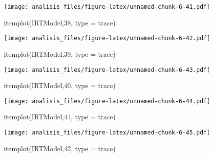 \documentclass[
]{article}
\newenvironment{Shaded}{\begin{snugshade}}{\end{snugshade}}
\newcommand{\AttributeTok}[1]{\textcolor[rgb]{0.77,0.63,0.00}{#1}}
\newcommand{\DecValTok}[1]{\textcolor[rgb]{0.00,0.00,0.81}{#1}}
\newcommand{\FunctionTok}[1]{\textcolor[rgb]{0.00,0.00,0.00}{#1}}
\newcommand{\NormalTok}[1]{#1}
\newcommand{\StringTok}[1]{\textcolor[rgb]{0.31,0.60,0.02}{#1}}
\begin{document}
\texttt{[image: analisis\_files/figure-latex/unnamed-chunk-6-41.pdf]}

\begin{Shaded}
\begin{Highlighting}[]
\FunctionTok{itemplot}\NormalTok{(IRTModel,}\DecValTok{38}\NormalTok{, }\AttributeTok{type =} \StringTok{\textquotesingle{}trace\textquotesingle{}}\NormalTok{)}
\end{Highlighting}
\end{Shaded}

\texttt{[image: analisis\_files/figure-latex/unnamed-chunk-6-42.pdf]}

\begin{Shaded}
\begin{Highlighting}[]
\FunctionTok{itemplot}\NormalTok{(IRTModel,}\DecValTok{39}\NormalTok{, }\AttributeTok{type =} \StringTok{\textquotesingle{}trace\textquotesingle{}}\NormalTok{)}
\end{Highlighting}
\end{Shaded}

\texttt{[image: analisis\_files/figure-latex/unnamed-chunk-6-43.pdf]}

\begin{Shaded}
\begin{Highlighting}[]
\FunctionTok{itemplot}\NormalTok{(IRTModel,}\DecValTok{40}\NormalTok{, }\AttributeTok{type =} \StringTok{\textquotesingle{}trace\textquotesingle{}}\NormalTok{)}
\end{Highlighting}
\end{Shaded}

\texttt{[image: analisis\_files/figure-latex/unnamed-chunk-6-44.pdf]}

\begin{Shaded}
\begin{Highlighting}[]
\FunctionTok{itemplot}\NormalTok{(IRTModel,}\DecValTok{41}\NormalTok{, }\AttributeTok{type =} \StringTok{\textquotesingle{}trace\textquotesingle{}}\NormalTok{)}
\end{Highlighting}
\end{Shaded}

\texttt{[image: analisis\_files/figure-latex/unnamed-chunk-6-45.pdf]}

\begin{Shaded}
\begin{Highlighting}[]
\FunctionTok{itemplot}\NormalTok{(IRTModel,}\DecValTok{42}\NormalTok{, }\AttributeTok{type =} \StringTok{\textquotesingle{}trace\textquotesingle{}}\NormalTok{)}
\end{Highlighting}
\end{Shaded}
\end{document}
